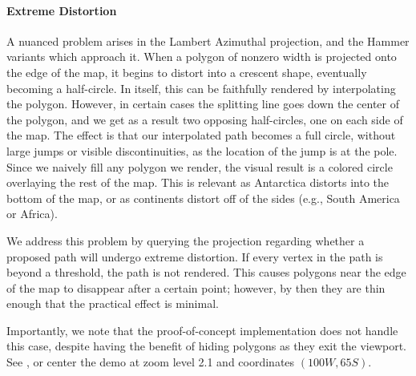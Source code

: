 \paragraph{Extreme Distortion}
A nuanced problem arises in the Lambert Azimuthal projection, and the Hammer
  variants which approach it.
When a polygon of nonzero width is projected onto the edge of the map, it
  begins to distort into a crescent shape, eventually becoming a half-circle.
In itself, this can be faithfully rendered by interpolating the polygon.
However, in certain cases the splitting line goes down the center of the
  polygon, and we get as a result two opposing half-circles, one on each side
  of the map.
The effect is that our interpolated path becomes a full circle, without large
  jumps or visible discontinuities, as the location of the jump is at the pole.
Since we naively fill any polygon we render, the visual result is a colored
  circle overlaying the rest of the map.
This is relevant as Antarctica distorts into the bottom of the map, or as
  continents distort off of the sides (e.g., South America or Africa).

We address this problem by querying the projection regarding whether a
  proposed path will undergo extreme distortion.
If every vertex in the path is beyond a threshold, the path is not rendered.
This causes polygons near the edge of the map to disappear after a certain
  point; however, by then they are thin enough that the practical effect is
  minimal.

Importantly, we note that the proof-of-concept implementation does not handle
  this case, despite having the benefit of hiding polygons as they exit the
  viewport.
See , or center the demo at zoom level 2.1 and coordinates
  $(100W, 65S)$.

